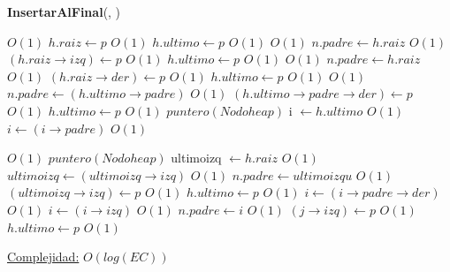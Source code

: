 \begin{Algoritmos}
\begin{algorithm}[H]{\textbf{InsertarAlFinal}(, )}
    	\begin{algorithmic}[1]
			 \Comment $O(1)$
    		\State $h.raiz \gets p$ \Comment $O(1)$
    		\State $h.ultimo \gets p$ \Comment $O(1)$
    	\Else
    		 \Comment $O(1)$
    			\State $n.padre \gets h.raiz$ \Comment $O(1)$
    			\State $(h.raiz \rightarrow izq) \gets p$ \Comment $O(1)$
    			\State $h.ultimo \gets p$    \Comment $O(1)$
    		\Else
    			 \Comment $O(1)$
    				\State $n.padre \gets h.raiz$ \Comment $O(1)$
    				\State $(h.raiz \rightarrow der) \gets p$ \Comment $O(1)$
    				\State $h.ultimo \gets p$ \Comment $O(1)$
    			\Else
    				 \Comment $O(1)$
    					\State $n.padre \gets (h.ultimo \rightarrow padre)$ \Comment $O(1)$
    					\State $(h.ultimo \rightarrow padre \rightarrow der) \gets p$ \Comment $O(1)$
    					\State $h.ultimo \gets p$ \Comment $O(1)$
    				\Else
						\State $puntero(Nodoheap)$ i $\gets h.ultimo$    				 \Comment $O(1)$	
    						\State $i \gets (i \rightarrow padre)$ \Comment $O(1)$
    					
    					\EndWhile
    					 \Comment $O(1)$
    						\State $puntero(Nodoheap)$ ultimoizq $\gets h.raiz$ \Comment $O(1)$
    							\State $ultimoizq \gets (ultimoizq \rightarrow izq)$ \Comment $O(1)$
    						\EndWhile
    						\State $n.padre \gets ultimoizqu$ \Comment $O(1)$
    						\State $(ultimoizq \rightarrow izq) \gets p$ \Comment $O(1)$
    						\State $h.ultimo \gets p$ \Comment $O(1)$
    					\Else
    						\State $i \gets (i \rightarrow padre \rightarrow der)$ \Comment $O(1)$
    							\State $i \gets (i \rightarrow izq)$ \Comment $O(1)$
    						\EndWhile
    						\State $n.padre \gets i$ \Comment $O(1)$
    						\State $(j \rightarrow izq) \gets p$ \Comment $O(1)$
    						\State $h.ultimo \gets p$ \Comment $O(1)$
    					\EndIf
    				\EndIf		
    			\EndIf	    	
	    	\EndIf
		\EndIf

			\medskip
			\Statex \underline{Complejidad:} $O(log(EC))$
    	\end{algorithmic}   	
\end{algorithm} $ $\newline
$ $\newline
$ $\newline
$ $\newline
$ $\newline
$ $\newline
$ $\newline
$ $\newline
$ $\newline
$ $\newline


\end{Algoritmos}
